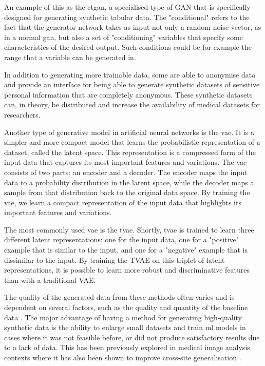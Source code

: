 \documentclass[12pt, a4paper]{article}
\begin{document}
An example of this as the \acrfull{ctgan}, a specialised type of GAN that is specifically designed for generating synthetic tabular data. The "conditional" refers to the fact that the generator network takes as input not only a random noise vector, as in a normal \acrshort{gan}, but also a set of "conditioning" variables that specify some characteristics of the desired output. Such conditions could be for example the range that a variable can be generated in.

In addition to generating more trainable data, some  are able to anonymise data \cite{liu_ppgan_2019} and provide an interface for being able to generate synthetic datasets of sensitive personal information that are completely anonymous. These synthetic datasets can, in theory, be distributed and increase the availability of medical datasets for researchers.

Another type of generative model in artificial neural networks is the \acrfull{vae}. It is a simpler and more compact model that learns the probabilistic representation of a dataset, called the latent space. This representation is a compressed form of the input data that captures its most important features and variations. The \acrshort{vae} consists of two parts: an encoder and a decoder. The encoder maps the input data to a probability distribution in the latent space, while the decoder maps a sample from that distribution back to the original data space. By training the \acrshort{vae}, we learn a compact representation of the input data that highlights its important features and variations. \cite{kingma_auto-encoding_2013}

The most commonly used \acrshort{vae} is the \acrfull{tvae}. Shortly, \acrshort{tvae} is trained to learn three different latent representations: one for the input data, one for a "positive" example that is similar to the input, and one for a "negative" example that is dissimilar to the input. By training the TVAE on this triplet of latent representations, it is possible to learn more robust and discriminative features than with a traditional VAE. \cite{}

The quality of the generated data from these methods often varies and is dependent on several factors, such as the quality and quantity of the baseline data \cite{karras_training_2020}.  The major advantage of having a method for generating high-quality synthetic data is the ability to enlarge small datasets and train \acrshort{ml}  models in cases where it was not feasible before, or did not produce satisfactory results due to a lack of data. This has been previously explored in medical image analysis contexts where it has also been shown to improve cross-site generalisation \cite{sanaat_robust-deep_2022, bashyam_deep_2022}.
\end{document}

